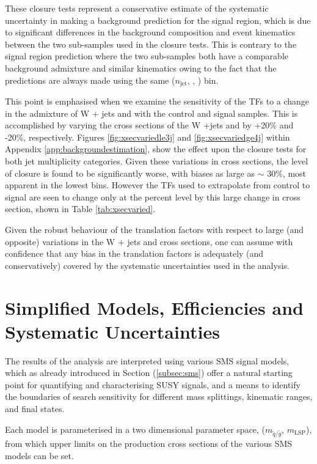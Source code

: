 These closure tests represent a conservative estimate of the systematic uncertainty in making a background prediction for the signal region, which is due to significant differences in the background composition and event kinematics between the two sub-samples used in the closure tests. This is contrary to the signal region prediction where the two sub-samples both have a comparable background admixture and similar kinematics owing to the fact that the predictions are always made using the same ($n_{\text{jet}}$, \nbreco, \theht) bin.

This point is emphasised when we examine the sensitivity of the \ac{TF}s to a change in the admixture of W + jets and \ttbar with the control and signal samples. This is accomplished by varying the cross sections of the W +jets and \ttbar by +20\% and -20\%, respectively. Figures \ref{fig:xsecvariedle3j} and \ref{fig:xsecvariedge4j} within Appendix \ref{app:backgroundestimation}, show the effect upon the closure tests for both jet multiplicity categories. Given these variations in cross sections, the level of closure is found to be significantly worse, with biases as large as $\sim$ 30\%, most apparent in the lowest \theht bins. However the \ac{TF}s used to extrapolate from control to signal are seen to change only at the percent level by this large change in cross section, shown in Table \ref{tab:xsecvaried}.

Given the robust behaviour of the translation factors with respect to large (and opposite) variations in the W + jets and \ttbar cross sections, one can assume with confidence that any bias in the translation factors is adequately (and conservatively) covered by the systematic uncertainties used in the analysis.

\section{Simplified Models, Efficiencies and Systematic Uncertainties}
\label{sec:smsmodels}

The results of the analysis are interpreted using various \ac{SMS} signal models, which as already introduced in Section (\ref{subsec:sms}) offer a natural starting point for quantifying and characterising \ac{SUSY} signals, and a means to identify the boundaries of search sensitivity for different mass splittings, kinematic ranges, and final states. 

Each model is parameterised in a two dimensional parameter space, ($m_{\widetilde{q}/\widetilde{g}}$, $m_{\text{LSP}}$), from which upper limits on the production cross sections of the various \ac{SMS} models can be set.

